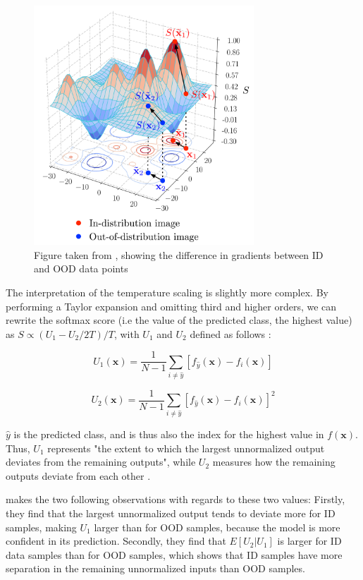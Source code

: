\documentclass[UKenglish]{uiomasterthesis} %
\theoremstyle{definition}
\begin{document}
\begin{figure}[h]
\centerline{\includegraphics[width=3.25in]{figure/gradient.png}}
\caption{Figure taken from \cite{odin}, showing the difference in gradients between ID and OOD data points}
\label{softmaxmove}
\end{figure}

The interpretation of the temperature scaling is slightly more complex. By performing a Taylor expansion and omitting third and higher orders, we can rewrite the softmax score (i.e the value of the predicted class, the highest value) as ${S\propto {(U_{1}-U_{2}/2T)/T}}$, with $U_1$ and $U_2$ defined as follows \cite[4]{odin}:


\begin{equation}\label{eq::u1u2}
U_{1}(\bm{x})=\frac{1}{N-1}\sum_{i\neq\hat{y}}[f_{\hat{y}}(\bm{x})-f_{i}(\bm{x})]
\end{equation}

\begin{equation}\label{eq::u1u2}
U_{2}(\bm{x})=\frac{1}{N-1}\sum_{i\neq\hat{y}}[f_{\hat{y}}(\bm{x})-f_{i}(\bm{x})]^{2}
\end{equation}

$\hat{y}$ is the predicted class, and is thus also the index for the highest value in $f(\bm{x})$. Thus, $U_1$ represents "the extent to which the largest unnormalized output deviates from the remaining outputs", while $U_2$ measures how the remaining outputs deviate from each other \cite[6]{odin}.

\cite{odin} makes the two following observations with regards to these two values: Firstly, they find that the largest unnormalized output tends to deviate more for ID samples, making $U_1$ larger than for OOD samples, because the model is more confident in its prediction. Secondly, they find that $E[U_2|U_1]$ is larger for ID data samples than for OOD samples, which shows that ID samples have more separation in the remaining unnormalized inputs than OOD samples. 
\end{document}
